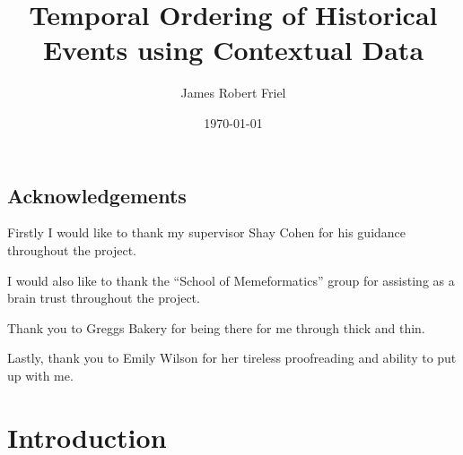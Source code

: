 \documentclass[bsc,frontabs,twoside,singlespacing,parskip,deptreport]{infthesis}     %
\begin{document}
\title{Temporal Ordering of Historical Events using Contextual Data}

\author{James Robert Friel}
 

\date{\today}



\maketitle

\section*{Acknowledgements}
Firstly I would like to thank my supervisor Shay Cohen for his guidance throughout the project.

I would also like to thank the ``School of Memeformatics'' group for assisting as a brain trust
throughout the project.

Thank you to Greggs Bakery for being there for me through thick and thin.

Lastly, thank you to Emily Wilson for her tireless proofreading and ability to put up with me.

\tableofcontents



\chapter{Introduction}
\end{document}
